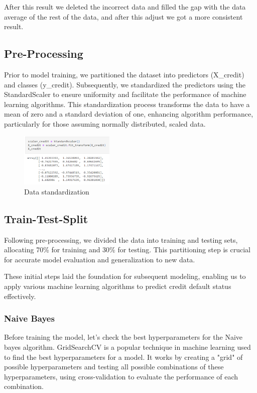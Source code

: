 \documentclass{sbrt}
\begin{document}
After this result we deleted the incorrect data and filled the gap with the data average of the rest of the data, and after this adjust we got a more consistent result.

\subsection{Pre-Processing}

Prior to model training, we partitioned the dataset into predictors (X\_credit) and classes (y\_credit). Subsequently, we standardized the predictors using the StandardScaler to ensure uniformity and facilitate the performance of machine learning algorithms. This standardization process transforms the data to have a mean of zero and a standard deviation of one, enhancing algorithm performance, particularly for those assuming normally distributed, scaled data.

\begin{figure}[htbp]
    \centering
    \includegraphics[width=0.4\textwidth]{images/Standadization.png}
    \caption{Data standardization}
    \label{fig:example}
\end{figure}


\subsection{Train-Test-Split}

Following pre-processing, we divided the data into training and testing sets, allocating 70\% for training and 30\% for testing. This partitioning step is crucial for accurate model evaluation and generalization to new data.

These initial steps laid the foundation for subsequent modeling, enabling us to apply various machine learning algorithms to predict credit default status effectively.

\subsubsection{Naive Bayes}

Before training the model, let's check the best hyperparameters for the Naive bayes algorithm. GridSearchCV is a popular technique in machine learning used to find the best hyperparameters for a model. It works by creating a "grid" of possible hyperparameters and testing all possible combinations of these hyperparameters, using cross-validation to evaluate the performance of each combination.
\end{document}
